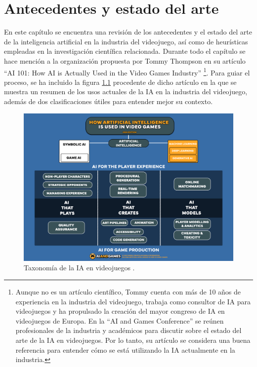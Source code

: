 \chapter{Antecedentes y estado del arte} \label{chap:antecedentes}

En este capítulo se encuentra una revisión de los antecedentes y el estado del arte de la inteligencia artificial en la industria del videojuego, así como de heurísticas empleadas en la investigación científica relacionada. Durante todo el capítulo se hace mención a la organización propuesta por Tommy Thompson en su artículo ``AI 101: How AI is Actually Used in the Video Games Industry'' \cite{thompson_how_2025}\footnote{Aunque no es un artículo científico, Tommy cuenta con más de 10 años de experiencia en la industria del videojuego, trabaja como consultor de IA para videojuegos y ha propulsado la creación del mayor congreso de IA en videojuegos de Europa. En la ``AI and Games Conference'' se reúnen profesionales de la industria y académicos para discutir sobre el estado del arte de la IA en videojuegos. Por lo tanto, su artículo se considera una buena referencia para entender cómo se está utilizando la IA actualmente en la industria.}. Para guiar el proceso, se ha incluido la figura \ref{fig:ia_taxonomia} procedente de dicho artículo en la que se muestra un resumen de los usos actuales de la IA en la industria del videojuego, además de dos clasificaciones útiles para entender mejor su contexto.

\begin{figure}
	\centering
	\includegraphics[width=1.0\textwidth]{img/AIforGames-Taxonomy.png}
	\caption{Taxonomía de la IA en videojuegos \cite{thompson_how_2025}.}
	\label{fig:ia_taxonomia}
\end{figure}

